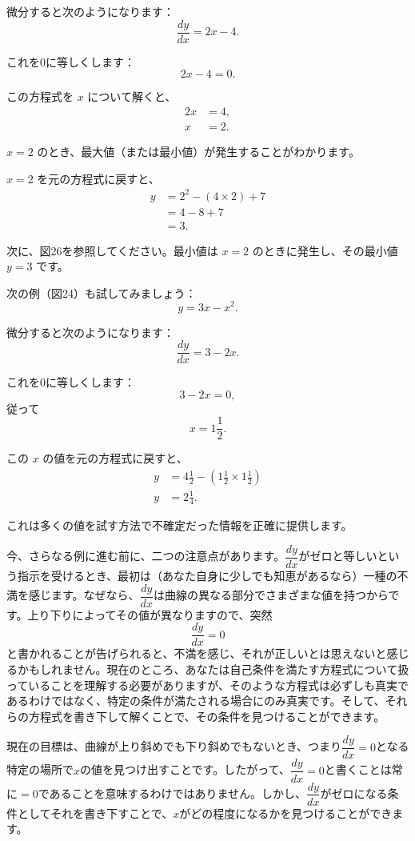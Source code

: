 \documentclass[a4paper,11pt,openany]{ltjsbook}
\begin{document}
微分すると次のようになります：
\[
\frac{dy}{dx} = 2x - 4.
\]

これを0に等しくします：
\[
2x - 4 = 0.
\]

この方程式を \(x\) について解くと、
\begin{align*}
2x &= 4, \\
x &= 2.
\end{align*}

\(x = 2\) のとき、最大値（または最小値）が発生することがわかります。

\(x = 2\) を元の方程式に戻すと、
\begin{align*}
y &= 2^2 - (4 \times 2) + 7 \\
  &= 4 - 8 + 7       \\
  &= 3.
\end{align*}

次に、図26を参照してください。最小値は \(x = 2\) のときに発生し、その最小値 \(y = 3\) です。

次の例（図24）も試してみましょう：
\[
y = 3x - x^2.
\]

微分すると次のようになります：
\[
\frac{dy}{dx} = 3 - 2x.
\]

これを0に等しくします：
\[
3 - 2x = 0,
\]
従って
\[
x = 1 \frac{1}{2}.
\]

この \(x\) の値を元の方程式に戻すと、
\begin{align*}
y &= 4 \frac{1}{2} - (1 \frac{1}{2} \times 1 \frac{1}{2}) \\
y &= 2 \frac{1}{4}.
\end{align*}

これは多くの値を試す方法で不確定だった情報を正確に提供します。

今、さらなる例に進む前に、二つの注意点があります。$\dfrac{dy}{dx}$がゼロと等しいという指示を受けるとき、最初は（あなた自身に少しでも知恵があるなら）一種の不満を感じます。なぜなら、$\dfrac{dy}{dx}$は曲線の異なる部分でさまざまな値を持つからです。上り下りによってその値が異なりますので、突然
\[
\dfrac{dy}{dx} = 0
\]
と書かれることが告げられると、不満を感じ、それが正しいとは思えないと感じるかもしれません。現在のところ、あなたは自己条件を満たす方程式について扱っていることを理解する必要がありますが、そのような方程式は必ずしも真実であるわけではなく、特定の条件が満たされる場合にのみ真実です。そして、それらの方程式を書き下して解くことで、その条件を見つけることができます。

現在の目標は、曲線が上り斜めでも下り斜めでもないとき、つまり$\dfrac{dy}{dx} = 0$となる特定の場所で$x$の値を見つけ出すことです。したがって、$\dfrac{dy}{dx} = 0$と書くことは常に$=0$であることを意味するわけではありません。しかし、$\dfrac{dy}{dx}$がゼロになる条件としてそれを書き下すことで、$x$がどの程度になるかを見つけることができます。
\end{document}
